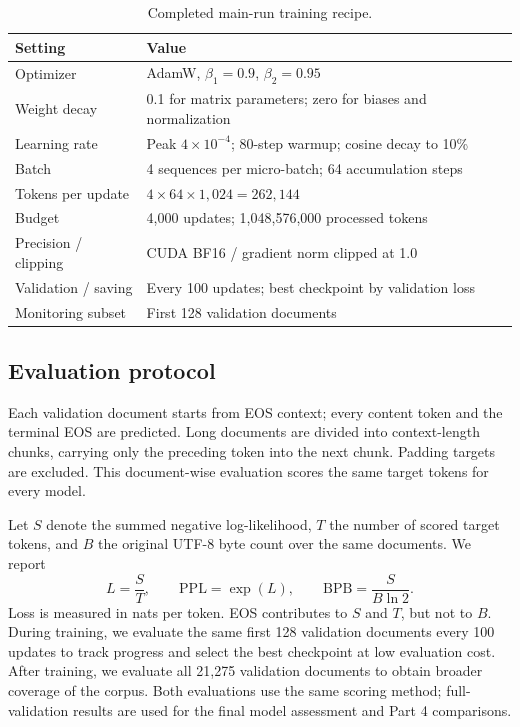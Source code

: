\documentclass{article}
\begin{document}
\begin{table}[H]
\setlength{\abovecaptionskip}{7pt}\setlength{\belowcaptionskip}{7pt}

\centering
\caption{Completed main-run training recipe.}\label{tab:recipe}
\begin{tabular}{ll}\toprule
Setting & Value\\\midrule
Optimizer & AdamW, $\beta_1=0.9$, $\beta_2=0.95$\\
Weight decay & 0.1 for matrix parameters; zero for biases and normalization\\
Learning rate & Peak $4\times10^{-4}$; 80-step warmup; cosine decay to 10\%\\
Batch & 4 sequences per micro-batch; 64 accumulation steps\\
Tokens per update & $4\times64\times1{,}024=262{,}144$\\
Budget & 4,000 updates; 1,048,576,000 processed tokens\\
Precision / clipping & CUDA BF16 / gradient norm clipped at 1.0\\
Validation / saving & Every 100 updates; best checkpoint by validation loss\\
Monitoring subset & First 128 validation documents\\\bottomrule
\end{tabular}
\end{table}

\clearpage
\subsection{Evaluation protocol}
Each validation document starts from EOS context; every content token and the terminal EOS are predicted. Long documents are divided into context-length chunks, carrying only the preceding token into the next chunk. Padding targets are excluded. This document-wise evaluation scores the same target tokens for every model.

Let $S$ denote the summed negative log-likelihood, $T$ the number of scored target tokens, and $B$ the original UTF-8 byte count over the same documents. We report
\begin{equation}
L=\frac{S}{T},\qquad \mathrm{PPL}=\exp(L),\qquad \mathrm{BPB}=\frac{S}{B\ln 2}.
\end{equation}
Loss is measured in nats per token. EOS contributes to $S$ and $T$, but not to $B$. During training, we evaluate the same first 128 validation documents every 100 updates to track progress and select the best checkpoint at low evaluation cost. After training, we evaluate all 21,275 validation documents to obtain broader coverage of the corpus. Both evaluations use the same scoring method; full-validation results are used for the final model assessment and Part 4 comparisons.
\end{document}
